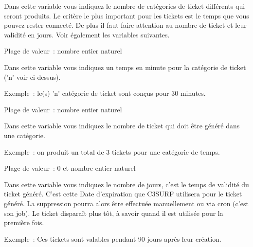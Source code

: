 \begin{description}
  Dans cette variable vous indiquez le nombre de catégories de ticket différents qui seront
  produits. Le critère le plus important pour les tickets est le temps que vous pouvez rester
  connecté. De plus il faut faire attention au nombre de ticket et leur validité en jours. Voir
  également les variables suivantes.



    Plage de valeur~: nombre entier naturel

  Dans cette variable vous indiquez un temps en minute pour la catégorie de ticket ('n' voir ci-dessus).

  Exemple~: le(s) 'n' catégorie de ticket sont conçus pour 30 minutes.



   Plage de valeur~: nombre entier naturel

  Dans cette variable vous indiquez le nombre de ticket qui doit être généré dans une catégorie.

  Exemple~: on produit un total de 3 tickets pour une catégorie de temps.



   Plage de valeur~: 0 et nombre entier naturel

  Dans cette variable vous indiquez le nombre de jours, c'est le temps de validité du ticket généré.
  C'est cette Date d'expiration que C3SURF utilisera pour le ticket généré. La suppression pourra
  alors être effectuée manuellement ou via cron (c'est son job). Le ticket disparaît plus tôt, à savoir quand il
  est utilisée pour la première fois.

  Exemple~: Ces tickets sont valables pendant 90 jours après leur création.


\end{description}

